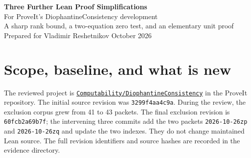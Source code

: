 \documentclass[11pt]{article}
\newcommand{\code}[1]{\nolinkurl{#1}}
\begin{document}
\begin{center}
{\Large\bfseries\color{ink}Three Further Lean Proof Simplifications}\\[5pt]
{\large For ProveIt's DiophantineConsistency development}\\[10pt]
{\normalsize A sharp rank bound, a two-equation zero test, and an elementary unit proof}\\[8pt]
Prepared for Vladimir Reshetnikov\quad\textbar{} October 2026
\end{center}

\begin{abstract}
This review proposes three residual simplifications after treating all ideas in
43 earlier proposal packets as available. The principal arithmetic result is
the sharp upper bound $R\le q^4-q^3-q-1$ for the reduced native-rank constraints,
proved by an explicit sum of nonnegative terms. It replaces a sequence of
coarser estimates in \code{source_window_bound}. A second result proves the
zero-test selector from annihilation and balance alone, removing the Boolean
idempotence argument from two existing soundness proofs while keeping the
literal certificate unchanged. A smaller third change proves that the actual
controller base is a unit from oddness of the modulus, without an element-order
calculation. The accompanying proof-only patches remove \TotalSaved{} physical
lines from four current modules, with no new production helpers or imports.
The mathematical kernels and source-shaped verification files were checked with
Lean 4.32.0 and the repository's pinned mathlib revision. A complete rebuild of
the production import graph was not performed; that remaining integration check
is explicitly separated from the checks completed here.
\end{abstract}

\section{Scope, baseline, and what is new}

The reviewed project is
\href{https://github.com/VladimirReshetnikov/ProveIt/tree/60fcb2a69b7f1fdd4c3592ea5f164223cad50abe/Computability/DiophantineConsistency}{\code{Computability/DiophantineConsistency}}
in the ProveIt repository. The initial source revision was
\code{3299f4aa4c9a}. During the review, the exclusion corpus grew from 41 to 43
packets. The final exclusion revision is \code{60fcb2a69b7f}; the intervening
three commits add the two packets \code{2026-10-26zp} and \code{2026-10-26zq}
and update the two indexes. They do not change maintained Lean source.
The full revision identifiers and source hashes are recorded in the evidence
directory.
\end{document}
